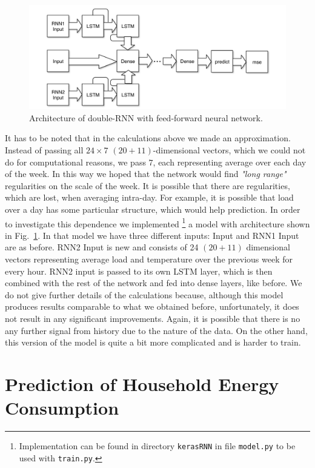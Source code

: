 \documentclass{article} %
\begin{document}
\begin{figure}[h]
\begin{center}
\includegraphics[width=1\linewidth]{energy_RNN2_diag.pdf}	
\end{center}
\caption{Architecture of double-RNN with feed-forward neural network.}
\label{fig:energy/rnn2_diag}
\end{figure}
It has to be noted that in the calculations above we made an approximation.
Instead of passing all $24\times7$ $(20+11)$-dimensional vectors,
which we could not do for computational reasons,
we  pass $7$, each representing average over each day of the week.
In this way we hoped that the network would find {\it "long range"}
regularities on the scale of the week. It is possible that there are
regularities, which are lost, when averaging intra-day. For example,
it is possible that load over a day has some particular structure,
which would help prediction.
In order to investigate this dependence we implemented%
\footnote{
Implementation can be found in directory {\tt kerasRNN} in file
{\tt model.py} to be used with {\tt train.py}.
}
a model with architecture shown in Fig.~\ref{fig:energy/rnn2_diag}.
In that model we have three different inputs: Input and RNN1 Input
are as before. RNN2 Input is new and consists of 24 $(20+11)$ dimensional 
vectors representing average load and temperature over the previous week 
for every hour. RNN2 input is passed to its own LSTM layer, which is 
then combined with the rest of the network and fed into dense layers,
like before.
We do not give further details of the calculations because, although
this model produces results comparable to what we obtained before, 
unfortunately, it does not result in any significant improvements.
Again, it is possible that there is no any further signal from history
due to the nature of the data. On the other hand, this version of the model
is quite a bit more complicated and is harder to train.




\section{Prediction of Household Energy Consumption}
\label{sec:house}
\end{document}
